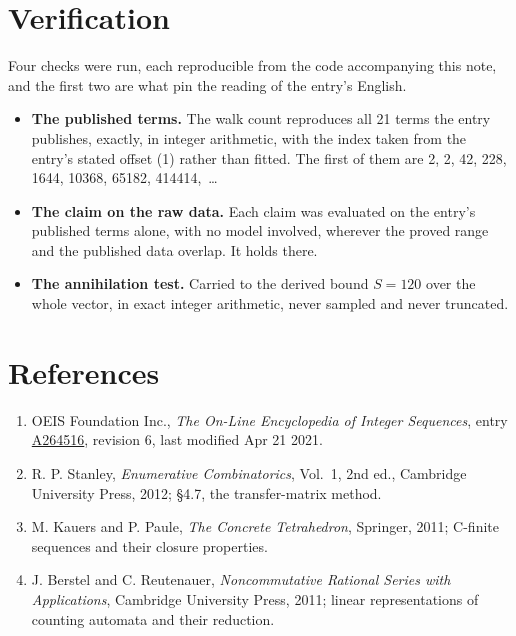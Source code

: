 \documentclass[11pt]{article}
\theoremstyle{definition}
\begin{document}
\section{Verification}

Four checks were run, each reproducible from the code accompanying this note, and the first two are what pin the reading of the entry's English.

\begin{itemize}

\item {\bfseries The published terms.} The walk count reproduces all 21 terms the entry publishes, exactly, in integer arithmetic, with the index taken from the entry's stated offset (1) rather than fitted. The first of them are 2, 2, 42, 228, 1644, 10368, 65182, 414414,~\dots

\item {\bfseries The claim on the raw data.} Each claim was evaluated on the entry's published terms alone, with no model involved, wherever the proved range and the published data overlap. It holds there.

\item {\bfseries The annihilation test.} Carried to the derived bound $S = 120$ over the whole vector, in exact integer arithmetic, never sampled and never truncated.

\end{itemize}

\section{References}

\begin{enumerate}

\item OEIS Foundation Inc., \emph{The On-Line Encyclopedia of Integer Sequences}, entry \href{https://oeis.org/A264516}{A264516}, revision 6, last modified Apr 21 2021.

\item R. P. Stanley, \emph{Enumerative Combinatorics}, Vol.~1, 2nd ed., Cambridge University Press, 2012; \S4.7, the transfer-matrix method.

\item M. Kauers and P. Paule, \emph{The Concrete Tetrahedron}, Springer, 2011; C-finite sequences and their closure properties.

\item J. Berstel and C. Reutenauer, \emph{Noncommutative Rational Series with Applications}, Cambridge University Press, 2011; linear representations of counting automata and their reduction.

\end{enumerate}
\end{document}
